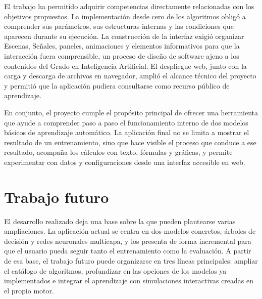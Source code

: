 El trabajo ha permitido adquirir competencias directamente relacionadas con los objetivos propuestos.
La implementación desde cero de los algoritmos obligó a comprender sus parámetros, sus estructuras internas y las condiciones que aparecen durante su ejecución.
La construcción de la interfaz exigió organizar Escenas, Señales, paneles, animaciones y elementos informativos para que la interacción fuera comprensible, un proceso de diseño de software ajeno a los contenidos del Grado en Inteligencia Artificial.
El despliegue web, junto con la carga y descarga de archivos en navegador, amplió el alcance técnico del proyecto y permitió que la aplicación pudiera consultarse como recurso público de aprendizaje.

En conjunto, el proyecto cumple el propósito principal de ofrecer una herramienta que ayude a comprender paso a paso el funcionamiento interno de dos modelos básicos de aprendizaje automático.
La aplicación final no se limita a mostrar el resultado de un entrenamiento, sino que hace visible el proceso que conduce a ese resultado, acompaña los cálculos con texto, fórmulas y gráficas, y permite experimentar con datos y configuraciones desde una interfaz accesible en web.

\section{Trabajo futuro}
\label{sec:trabajo_futuro}

El desarrollo realizado deja una base sobre la que pueden plantearse varias ampliaciones.
La aplicación actual se centra en dos modelos concretos, árboles de decisión y redes neuronales multicapa, y los presenta de forma incremental para que el usuario pueda seguir tanto el entrenamiento como la evaluación.
A partir de esa base, el trabajo futuro puede organizarse en tres líneas principales: ampliar el catálogo de algoritmos, profundizar en las opciones de los modelos ya implementados e integrar el aprendizaje con simulaciones interactivas creadas en el propio motor.


